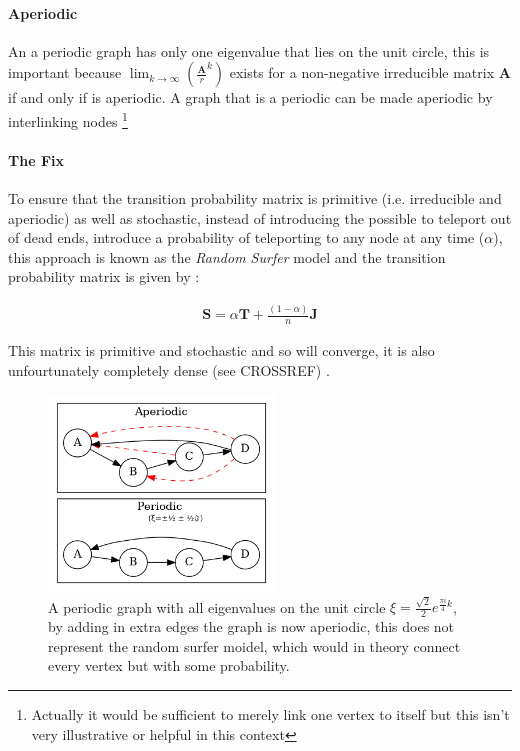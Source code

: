 \documentclass[11pt]{article}
\begin{document}
\paragraph{Aperiodic}
\label{sec:org681f32f}
An a periodic graph has only one eigenvalue that lies on the unit circle, this is important because \(\lim_{k\rightarrow \infty} \left( \frac{\mathbf{A}}{r}^{k} \right)\) exists for a non-negative irreducible matrix \(\mathbf{A}\) if and only if  is aperiodic. A graph that is a periodic can be made aperiodic by interlinking nodes \footnote{Actually it would be sufficient to merely link one vertex to itself \cite[]{langvilleGooglePageRankScience2012} but this isn't very illustrative or helpful in this context}

\paragraph{The Fix}
\label{sec:orgba5660e}
To ensure that the transition probability matrix is primitive (i.e. irreducible and aperiodic) as well as stochastic, instead of introducing the possible to teleport out of dead ends, introduce a probability of teleporting to any node at any time (\(\alpha\)), this approach is known as the \emph{Random Surfer} model and the transition probability matrix is given by \cite{larrypageAnatomyLargescaleHypertextual1998} :

\begin{align}
\mathbf{S} = \alpha \mathbf{T} + \frac{(1- \alpha)}{n} \mathbf{J} \label{eq:random-surfer}
\end{align}

This matrix is primitive and stochastic and so will converge, it is also unfourtunately completely dense (see CROSSREF) \cite[]{langvilleGooglePageRankScience2012}.

\begin{figure}[htbp]
\centering
\includegraphics[width=6cm]{media/dot/aperiodic.dot.png}
\caption{\label{fig:aperiodic}A periodic graph with all eigenvalues on the unit circle \(\xi = \frac{\sqrt{2}}{2} e^{\frac{\pi i}{4} k}\), by adding in extra edges the graph is now aperiodic, this does not represent the random surfer moidel, which would in theory connect every vertex but with some probability.}
\end{figure}
\end{document}
